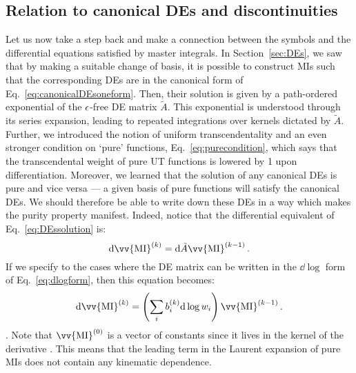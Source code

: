 \documentclass[main.tex]{subfiles}
\begin{document}
\subsection{Relation to canonical DEs and discontinuities}
Let us now take a step back and make a connection between the symbols and the differential equations satisfied by master integrals. In Section~\ref{sec:DEs}, we saw that by making a suitable change of basis, it is possible to construct MIs such that the corresponding DEs are in the canonical form of Eq.~\ref{eq:canonicalDEsoneform}. Then, their solution is given by a path-ordered exponential of the $\epsilon$-free DE matrix $\tilde{A}$. This exponential is understood through its series expansion, leading to repeated integrations over kernels dictated by $\tilde{A}$. Further, we introduced the notion of uniform transcendentality and an even stronger condition on `pure' functions, Eq.~\ref{eq:purecondition}, which says that the transcendental weight of pure UT functions is lowered by 1 upon differentiation. Moreover, we learned that the solution of any canonical DEs is pure and vice versa --- a given basis of pure functions will satisfy the canonical DEs. We should therefore be able to write down these DEs in a way which makes the purity property manifest. Indeed, notice that the differential equivalent of Eq.~\ref{eq:DEssolution} is:
\begin{equation}
    \dd \vv{\text{MI}}^{(k)} = \dd \tilde{A} \vv{\text{MI}}^{(k-1)}\,.
\end{equation}
If we specify to the cases where the DE matrix can be written in the $\dd \log$ form of Eq.~\ref{eq:dlogform}, then this equation becomes:
\begin{equation} \label{eq:pureMIDEs}
    \dd \vv{\text{MI}}^{(k)} = \left( \sum_i b_i^{(k)} \dd \log w_i  \right)\vv{\text{MI}}^{(k-1)}\,.
\end{equation}
. Note that $\vv{\text{MI}}^{(0)}$ is a vector of constants since it lives in the kernel of the derivative . This means that the leading term in the Laurent expansion of pure MIs does not contain any kinematic dependence. 
\end{document}
